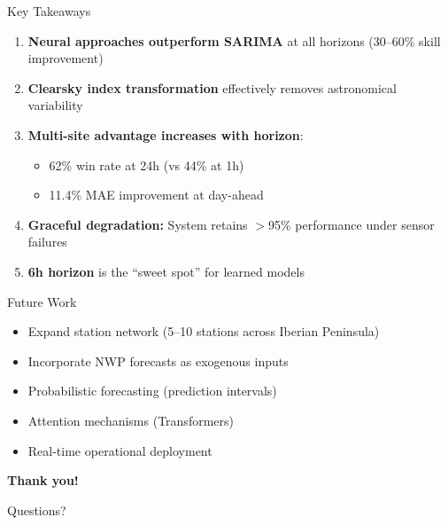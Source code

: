 \documentclass[aspectratio=169,11pt]{beamer}
\begin{document}
\begin{frame}{Key Takeaways}
\begin{enumerate}
    \item \textbf{Neural approaches outperform SARIMA} at all horizons (30--60\% skill improvement)
    
    \vspace{0.3cm}
    \item \textbf{Clearsky index transformation} effectively removes astronomical variability
    
    \vspace{0.3cm}
    \item \textbf{Multi-site advantage increases with horizon}:
    \begin{itemize}
        \item 62\% win rate at 24h (vs 44\% at 1h)
        \item 11.4\% MAE improvement at day-ahead
    \end{itemize}
    
    \vspace{0.3cm}
    \item \textbf{Graceful degradation:} System retains $>$95\% performance under sensor failures
    
    \vspace{0.3cm}
    \item \textbf{6h horizon} is the ``sweet spot'' for learned models
\end{enumerate}
\end{frame}

\begin{frame}{Future Work}
\begin{itemize}
    \item Expand station network (5--10 stations across Iberian Peninsula)
    \item Incorporate NWP forecasts as exogenous inputs
    \item Probabilistic forecasting (prediction intervals)
    \item Attention mechanisms (Transformers)
    \item Real-time operational deployment
\end{itemize}

\vspace{1cm}
\centering
\Large\textbf{Thank you!}

\vspace{0.5cm}
\normalsize
Questions?
\end{frame}
\end{document}
